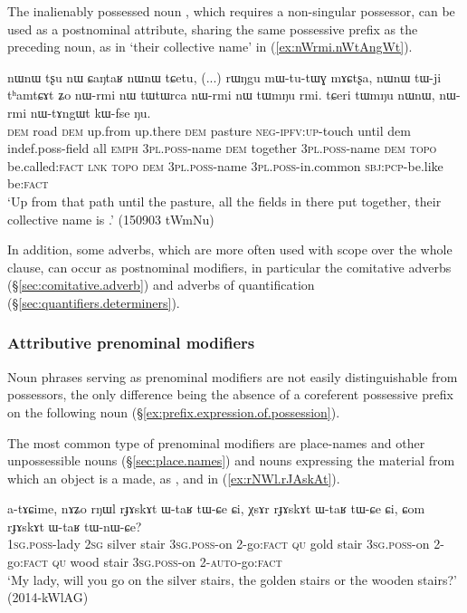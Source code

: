 The inalienably possessed noun , which requires a non-singular possessor, can be used as a postnominal attribute, sharing the same possessive prefix as the preceding noun, as in  `their collective name' in (\ref{ex:nWrmi.nWtAngWt}).

\begin{exe}
\ex \label{ex:nWrmi.nWtAngWt}
\gll nɯnɯ tʂu nɯ ɕaŋtaʁ nɯnɯ tɕetu, (...) rɯŋgu mɯ-tu-tɯɣ mɤɕtʂa, nɯnɯ tɯ-ji tʰamtɕɤt ʑo nɯ-rmi nɯ tɯtɯrca nɯ-rmi nɯ tɯmŋu rmi.  tɕeri tɯmŋu nɯnɯ, nɯ-rmi nɯ-tɤngɯt kɯ-fse ŋu. \\
\textsc{dem} road \textsc{dem} up.from up.there \textsc{dem} {  } pasture \textsc{neg}-\textsc{ipfv}:\textsc{up}-touch until dem indef.poss-field all \textsc{emph} \textsc{3pl}.\textsc{poss}-name \textsc{dem} together \textsc{3pl}.\textsc{poss}-name \textsc{dem}  \textsc{topo} be.called:\textsc{fact} \textsc{lnk}  \textsc{topo} \textsc{dem}  \textsc{3pl}.\textsc{poss}-name  \textsc{3pl}.\textsc{poss}-in.common \textsc{sbj}:\textsc{pcp}-be.like be:\textsc{fact} \\
\glt `Up from that path until the pasture, all the fields in there put together, their collective name is .' (150903 tWmNu)
\end{exe}
In addition, some adverbs, which are more often used with scope over the whole clause, can occur as postnominal modifiers, in particular the comitative adverbs (§\ref{sec:comitative.adverb}) and adverbs of quantification (§\ref{sec:quantifiers.determiners}).

 
\subsubsection{Attributive prenominal modifiers}   \label{ex:attributive.prenominal}
Noun phrases serving as prenominal modifiers are not easily distinguishable from possessors, the only difference being the absence of a coreferent possessive prefix on the following noun (§\ref{ex:prefix.expression.of.possession}). 

The most common type of prenominal modifiers are place-names and other unpossessible nouns (§\ref{sec:place.names}) and nouns expressing the material from which an object is a made, as ,  and  in (\ref{ex:rNWl.rJAskAt}).

\begin{exe}
\ex \label{ex:rNWl.rJAskAt}
\gll a-tɤɕime, nɤʑo rŋɯl rɟɤskɤt ɯ-taʁ tɯ-ɕe ɕi, χsɤr rɟɤskɤt ɯ-taʁ tɯ-ɕe ɕi, ɕom rɟɤskɤt ɯ-taʁ tɯ-nɯ-ɕe? \\
\textsc{1sg}.\textsc{poss}-lady \textsc{2sg} silver stair \textsc{3sg}.\textsc{poss}-on 2-go:\textsc{fact}  \textsc{qu} gold stair \textsc{3sg}.\textsc{poss}-on 2-go:\textsc{fact} \textsc{qu} wood stair \textsc{3sg}.\textsc{poss}-on 2-\textsc{auto}-go:\textsc{fact} \\
\glt `My lady, will you go on the silver stairs, the golden stairs or the wooden stairs?' (2014-kWlAG)
\end{exe}

